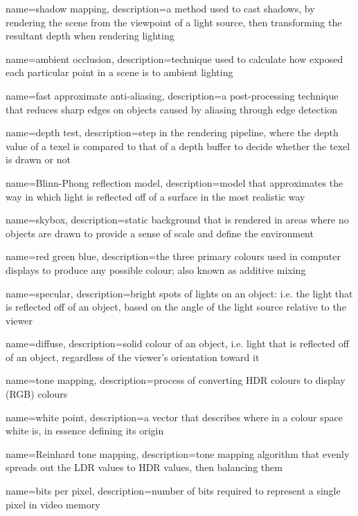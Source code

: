  {
  name=shadow mapping,
  description={a method used to cast shadows, by rendering the scene from the viewpoint of a light source, then transforming the resultant depth when rendering lighting}
}

 {
  name=ambient occlusion,
  description={technique used to calculate how exposed each particular point in a scene is to ambient lighting}
}

 {
  name=fast approximate anti-aliasing,
  description={a post-processing technique that reduces sharp edges on objects caused by \gls{aliasing} through edge detection}
}

 {
  name=depth test,
  description={step in the rendering pipeline, where the depth value of a texel is compared to that of a depth buffer to decide whether the texel is drawn or not}
}

 {
  name=Blinn-Phong reflection model,
  description={model that approximates the way in which light is reflected off of a surface in the most realistic way}
}

 {
  name=skybox,
  description={static background that is rendered in areas where no objects are drawn to provide a sense of scale and define the environment}
}

 {
  name=red green blue,
  description={the three primary colours used in computer displays to produce any possible colour; also known as additive mixing}
}

 {
  name=specular,
  description={bright spots of lights on an object: i.e. the light that is reflected off of an object, based on the angle of the light source relative to the viewer}
}

 {
  name=diffuse,
  description={solid colour of an object, i.e. light that is reflected off of an object, regardless of the viewer's orientation toward it}
}

 {
  name=tone mapping,
  description={process of converting \gls{HDR} colours to display (\gls{RGB}) colours}
}

 {
  name=white point,
  description={a vector that describes where in a colour space white is, in essence defining its origin}
}

 {
  name=Reinhard tone mapping,
  description={\gls{tone mapping} algorithm that evenly spreads out the \gls{LDR} values to \gls{HDR} values, then balancing them}
}

 {
  name=bits per pixel,
  description={number of bits required to represent a single pixel in video memory}
}